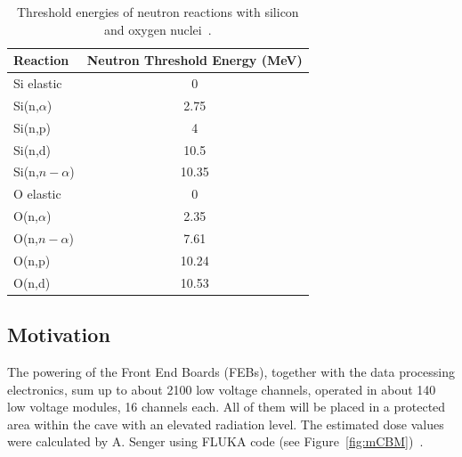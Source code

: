 \begin{table}[!h]
\centering
\caption{Threshold energies of neutron reactions with silicon and oxygen nuclei~\cite{ENDF}.}
\begin{tabular}{lc}
\hline
Reaction         & Neutron Threshold Energy (MeV) \\ \hline
Si elastic       & 0                              \\
Si(n,$\alpha$)   & 2.75                           \\
Si(n,p)          & 4                              \\
Si(n,d)          & 10.5                           \\
Si(n,$n-\alpha$) & 10.35                          \\ \hline
O elastic        & 0                              \\
O(n,$\alpha$)    & 2.35                           \\
O(n,$n-\alpha$)  & 7.61                           \\
O(n,p)           & 10.24                          \\
O(n,d)           & 10.53                         
\end{tabular}

\label{cross-seciton}
\end{table}

\newpage
\subsection{Motivation}

The powering of the Front End Boards (\gls{FEB}s), together with the data processing electronics, sum up to about 2100 low voltage channels, operated in about 140 low voltage modules, 16 channels each. All of them will be placed in a protected area within the cave with an elevated radiation level. The estimated dose values were calculated by A. Senger using FLUKA code (see Figure~\ref{fig:mCBM})~\cite{FLUKA}. 

